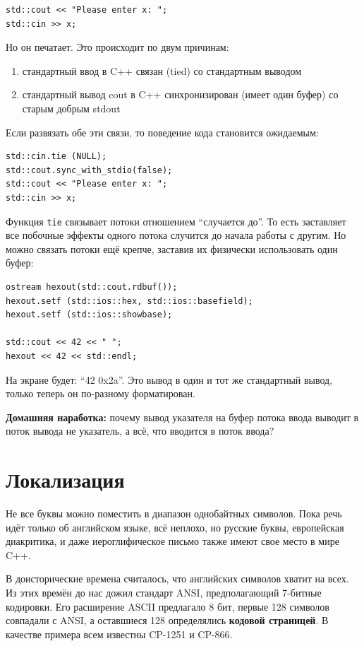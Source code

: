 \documentclass[a4paper,12pt,oneside]{book}
\begin{document}
\begin{lstlisting}
std::cout << "Please enter x: ";
std::cin >> x;
\end{lstlisting}

Но он печатает. Это происходит по двум причинам:

\begin{enumerate}
\item стандартный ввод в C++ связан (tied) со стандартным выводом
\item стандартный вывод cout в C++ синхронизирован (имеет один буфер) со старым добрым stdout
\end{enumerate}

Если развязать обе эти связи, то поведение кода становится ожидаемым:

\begin{lstlisting}
std::cin.tie (NULL);
std::cout.sync_with_stdio(false);
std::cout << "Please enter x: ";
std::cin >> x;
\end{lstlisting}

Функция \lstinline!tie! связывает потоки отношением ``случается до''. То есть заставляет все побочные эффекты одного потока случится до начала работы с другим. Но можно связать потоки ещё крепче, заставив их физически использовать один буфер:

\begin{lstlisting}
ostream hexout(std::cout.rdbuf());
hexout.setf (std::ios::hex, std::ios::basefield);
hexout.setf (std::ios::showbase);

std::cout << 42 << " ";
hexout << 42 << std::endl;
\end{lstlisting}

На экране будет: ``42 0x2a''. Это вывод в один и тот же стандартный вывод, только теперь он по-разному форматирован.

\textbf{Домашняя наработка:} почему вывод указателя на буфер потока ввода выводит в поток вывода не указатель, а всё, что вводится в поток ввода?

\pagebreak
\section{Локализация}\label{Localization}

Не все буквы можно поместить в диапазон однобайтных символов. Пока речь идёт только об английском языке, всё неплохо, но русские буквы, европейская диакритика, и даже иероглифическое письмо также имеют свое место в мире C++.

В доисторические времена считалось, что английских символов хватит на всех. Из этих времён до нас дожил стандарт ANSI, предполагающий 7-битные кодировки. Его расширение ASCII предлагало 8 бит, первые 128 символов совпадали с ANSI, а оставшиеся 128 определялись \textbf{кодовой страницей}. В качестве примера всем известны CP-1251 и CP-866.
\end{document}
